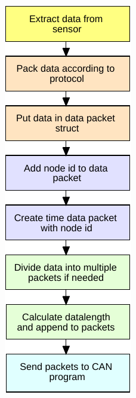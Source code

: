 \begin{figure}[!h]
    \centering
    \begin{subfigure}[b]{0.33\textwidth}
        \includegraphics[width=\textwidth]{graphics/FlowChart_Node_Packing}

\end{subfigure}
\end{figure}
